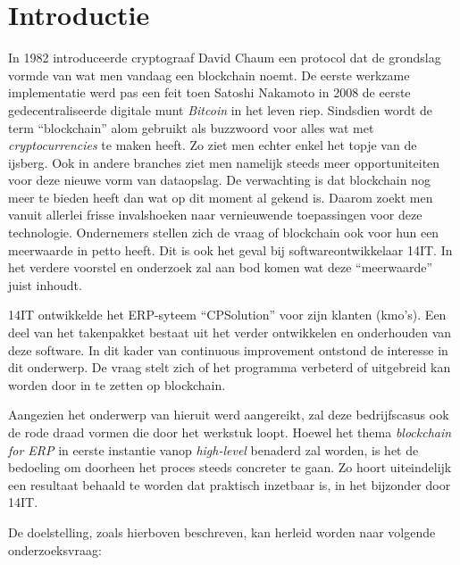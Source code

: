 
\section{Introductie} %
\label{sec:introductie}

In 1982 introduceerde cryptograaf David Chaum een protocol dat de grondslag vormde van wat men vandaag een blockchain noemt. De eerste werkzame implementatie werd pas een feit toen Satoshi Nakamoto in 2008 de eerste gedecentraliseerde digitale munt \textit{Bitcoin} in het leven riep. Sindsdien wordt de term ``blockchain'' alom gebruikt als buzzwoord voor alles wat met \textit{cryptocurrencies} te maken heeft. Zo ziet men echter enkel het topje van de ijsberg. Ook in andere branches ziet men namelijk steeds meer opportuniteiten voor deze nieuwe vorm van dataopslag. De verwachting is dat blockchain nog meer te bieden heeft dan wat op dit moment al gekend is. Daarom zoekt men vanuit allerlei frisse invalshoeken naar vernieuwende toepassingen voor deze technologie. Ondernemers stellen zich de vraag of blockchain ook voor hun een meerwaarde in petto heeft. Dit is ook het geval bij softwareontwikkelaar 14IT. In het verdere voorstel en onderzoek zal aan bod komen wat deze ``meerwaarde'' juist inhoudt.

14IT ontwikkelde het ERP-syteem ``CPSolution'' voor zijn klanten (kmo's). Een deel van het takenpakket bestaat uit het verder ontwikkelen en onderhouden van deze software. In dit kader van continuous improvement ontstond de interesse in dit onderwerp. De vraag stelt zich of het programma verbeterd of uitgebreid kan worden door in te zetten op blockchain.

Aangezien het onderwerp van hieruit werd aangereikt, zal deze bedrijfscasus ook de rode draad vormen die door het werkstuk loopt. Hoewel het thema \textit{blockchain for ERP} in eerste instantie vanop \textit{high-level} benaderd zal worden, is het de bedoeling om doorheen het proces steeds concreter te gaan. Zo hoort uiteindelijk een resultaat behaald te worden dat praktisch inzetbaar is, in het bijzonder door 14IT.


De doelstelling, zoals hierboven beschreven, kan herleid worden naar volgende onderzoeksvraag:

